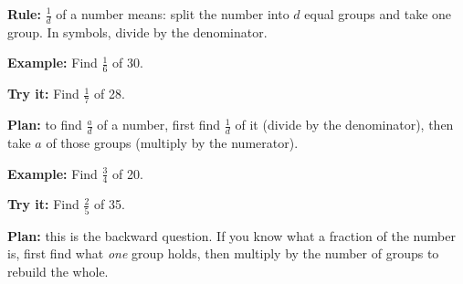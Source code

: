 \documentclass[12pt]{article}
\begin{document}


\begin{formulabox}
\textbf{Rule:} $\tfrac{1}{d}$ of a number means: split the number into $d$
equal groups and take one group. In symbols, divide by the denominator.
\end{formulabox}

\begin{examplebox}
\textbf{Example:} \quad Find $\tfrac{1}{6}$ of 30.
\end{examplebox}

\begin{tryitbox}
\textbf{Try it:} \quad Find $\tfrac{1}{7}$ of 28.\\[2pt]
\end{tryitbox}


\begin{formulabox}
\textbf{Plan:} to find $\tfrac{a}{d}$ of a number, first find
$\tfrac{1}{d}$ of it (divide by the denominator), then take $a$ of those
groups (multiply by the numerator).
\end{formulabox}

\begin{examplebox}
\textbf{Example:} \quad Find $\tfrac{3}{4}$ of 20.
\end{examplebox}

\begin{tryitbox}
\textbf{Try it:} \quad Find $\tfrac{2}{5}$ of 35.\\[2pt]
\end{tryitbox}


\begin{formulabox}
\textbf{Plan:} this is the backward question. If you know what a fraction of
the number is, first find what \emph{one} group holds, then multiply by the
number of groups to rebuild the whole.
\end{formulabox}
\end{document}
